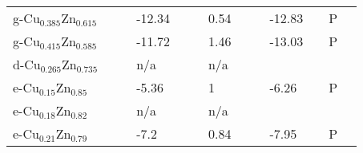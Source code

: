 \documentclass{article}
\begin{document}
\begin{center}
\begin{longtable}{|l|p{2.5cm}|l|p{2.5cm}|l|l|p{2.5cm}|l|l|p{2.5cm}|l|l|l|}
g-Cu$_{0.385}$Zn$_{0.615}$  &            &                     & -12.34  &  & \citep{KubaschewskiCatterallJohnAshley.1956} & 0.54   &  & \citep{KubaschewskiCatterallJohnAshley.1956} & -12.83  &  & P                    \\
g-Cu$_{0.415}$Zn$_{0.585 }$ &            &                     & -11.72  &  & \citep{KubaschewskiCatterallJohnAshley.1956} & 1.46   &  & \citep{KubaschewskiCatterallJohnAshley.1956} & -13.03  &  & P                    \\
d-Cu$_{0.265}$Zn$_{0.735}$  &            &                     & n/a     &  & \citep{KubaschewskiCatterallJohnAshley.1956} & n/a    &  & \citep{KubaschewskiCatterallJohnAshley.1956} &         &  &                      \\
e-Cu$_{0.15}$Zn$_{0.85 }$   &            &                     & -5.36   &  & \citep{KubaschewskiCatterallJohnAshley.1956} & 1      &  & \citep{KubaschewskiCatterallJohnAshley.1956} & -6.26   &  & P                    \\
e-Cu$_{0.18}$Zn$_{0.82}$    &            &                     & n/a     &  & \citep{KubaschewskiCatterallJohnAshley.1956} & n/a    &  & \citep{KubaschewskiCatterallJohnAshley.1956} &         &  &                      \\
e-Cu$_{0.21}$Zn$_{0.79}$    &            &                     & -7.2    &  & \citep{KubaschewskiCatterallJohnAshley.1956} & 0.84   &  & \citep{KubaschewskiCatterallJohnAshley.1956} & -7.95   &  & P                   



\end{longtable}
\end{center}
\end{document}
